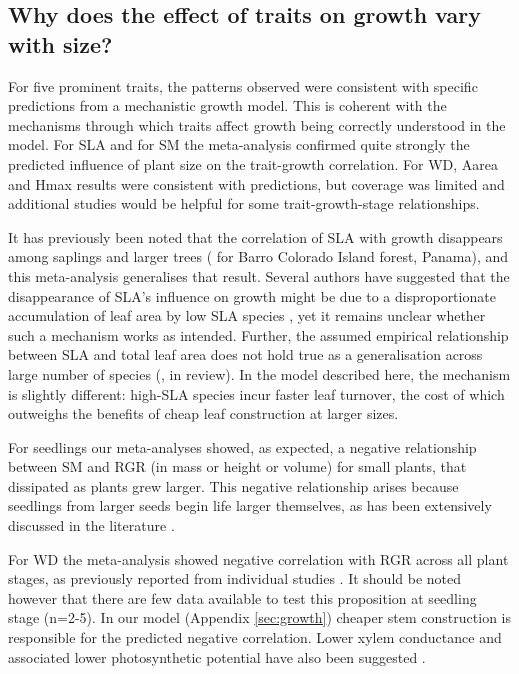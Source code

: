 \documentclass[a4paper,11pt]{article}
\begin{document}
\subsection*{Why does the effect of traits on growth vary with size?}

For five prominent traits, the patterns observed were consistent with specific predictions from a mechanistic growth model. This is coherent with the mechanisms through which traits affect growth being correctly understood in the model. For SLA and for SM the meta-analysis confirmed quite strongly the predicted influence of plant size on the trait-growth correlation. For WD, Aarea and Hmax results were consistent with predictions, but coverage was limited and additional studies would be helpful for some trait-growth-stage relationships. 

It has previously been noted that the correlation of SLA with growth disappears among saplings and larger trees (\citealt{Wright:2010tp} for Barro Colorado Island forest, Panama), and this meta-analysis generalises that result. Several authors have suggested that the disappearance of SLA's influence on growth might be due to a disproportionate accumulation of leaf area by low SLA species \citep{Reich:1992wm,Poorter:2008iu,Wright:2010tp}, yet it remains unclear whether such a mechanism works as intended. Further, the assumed empirical relationship between SLA and total leaf area does not hold true as a generalisation across large number of species (\citeauthor{Duursma-2015}, in review). In the model described here, the mechanism is slightly different: high-SLA species incur faster leaf turnover, the cost of which outweighs the benefits of cheap leaf construction at larger sizes.

For seedlings our meta-analyses showed, as expected, a negative relationship between SM and RGR (in mass or height or volume) for small plants, that dissipated as plants grew larger. This negative relationship arises because seedlings from larger seeds begin life larger themselves, as has been extensively discussed in the literature \citep[reviewed by][]{Turnbull:2012ew}. 

For WD the meta-analysis showed negative correlation with RGR across all plant stages, as previously reported from individual studies \citep{Wright:2010tp,Ruger:2012jv}. It should be noted however that there are few data available to test this proposition at seedling stage (n=2-5). In our model (Appendix \ref{sec:growth}) cheaper stem construction is responsible for the predicted negative correlation. Lower xylem conductance and associated lower photosynthetic potential have also been suggested \citep[reviewed by][]{Chave:2009iy}.
\end{document}
